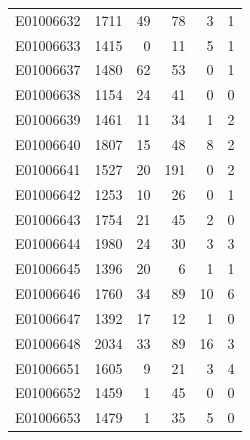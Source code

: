 \documentclass[
  letterpaper,
  DIV=11,
  numbers=noendperiod]{scrreprt}
\begin{document}
\begin{tabular}{lrrrrr}
E01006632     &    1711 &      49 &                    78 &                               3 &                       1 \\
E01006633     &    1415 &       0 &                    11 &                               5 &                       1 \\
E01006637     &    1480 &      62 &                    53 &                               0 &                       1 \\
E01006638     &    1154 &      24 &                    41 &                               0 &                       0 \\
E01006639     &    1461 &      11 &                    34 &                               1 &                       2 \\
E01006640     &    1807 &      15 &                    48 &                               8 &                       2 \\
E01006641     &    1527 &      20 &                   191 &                               0 &                       2 \\
E01006642     &    1253 &      10 &                    26 &                               0 &                       1 \\
E01006643     &    1754 &      21 &                    45 &                               2 &                       0 \\
E01006644     &    1980 &      24 &                    30 &                               3 &                       3 \\
E01006645     &    1396 &      20 &                     6 &                               1 &                       1 \\
E01006646     &    1760 &      34 &                    89 &                              10 &                       6 \\
E01006647     &    1392 &      17 &                    12 &                               1 &                       0 \\
E01006648     &    2034 &      33 &                    89 &                              16 &                       3 \\
E01006651     &    1605 &       9 &                    21 &                               3 &                       4 \\
E01006652     &    1459 &       1 &                    45 &                               0 &                       0 \\
E01006653     &    1479 &       1 &                    35 &                               5 &                       0 \\

\end{tabular}
\end{document}
